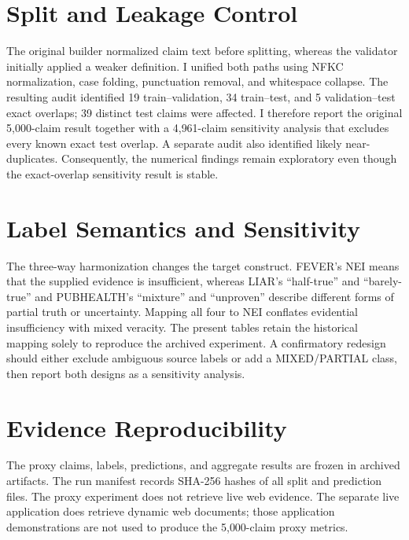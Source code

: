 \documentclass[12pt,a4paper,openany]{report}
\begin{document}
\section{Split and Leakage Control}
The original builder normalized claim text before splitting, whereas the
validator initially applied a weaker definition. I unified both paths using
NFKC normalization, case folding, punctuation removal, and whitespace
collapse. The resulting audit identified 19 train--validation, 34 train--test,
and 5 validation--test exact overlaps; 39 distinct test claims were affected.
I therefore report the original 5{,}000-claim result together with a
4{,}961-claim sensitivity analysis that excludes every known exact test
overlap. A separate audit also identified likely near-duplicates. Consequently,
the numerical findings remain exploratory even though the exact-overlap
sensitivity result is stable.

\section{Label Semantics and Sensitivity}
The three-way harmonization changes the target construct. FEVER's NEI means
that the supplied evidence is insufficient, whereas LIAR's ``half-true'' and
``barely-true'' and PUBHEALTH's ``mixture'' and ``unproven'' describe different
forms of partial truth or uncertainty. Mapping all four to NEI conflates
evidential insufficiency with mixed veracity. The present tables retain the
historical mapping solely to reproduce the archived experiment. A
confirmatory redesign should either exclude ambiguous source labels or add a
MIXED/PARTIAL class, then report both designs as a sensitivity analysis.

\section{Evidence Reproducibility}
The proxy claims, labels, predictions, and aggregate results are frozen in archived artifacts. The run manifest records SHA-256 hashes of all split and prediction files. The proxy experiment does not retrieve live web evidence. The separate live application does retrieve dynamic web documents; those application demonstrations are not used to produce the 5{,}000-claim proxy metrics.
\end{document}
